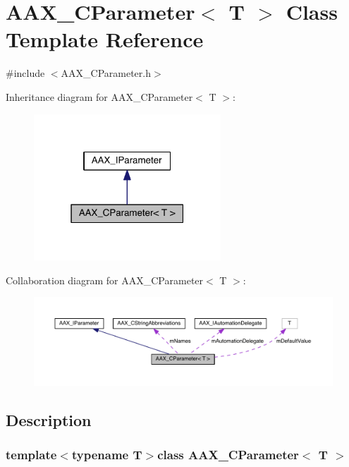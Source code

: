 \hypertarget{a00033}{}\section{A\+A\+X\+\_\+\+C\+Parameter$<$ T $>$ Class Template Reference}
\label{a00033}


{\ttfamily \#include $<$A\+A\+X\+\_\+\+C\+Parameter.\+h$>$}



Inheritance diagram for A\+A\+X\+\_\+\+C\+Parameter$<$ T $>$\+:
\nopagebreak
\begin{figure}[H]
\begin{center}
\leavevmode
\includegraphics[width=199pt]{a00447}
\end{center}
\end{figure}


Collaboration diagram for A\+A\+X\+\_\+\+C\+Parameter$<$ T $>$\+:
\nopagebreak
\begin{figure}[H]
\begin{center}
\leavevmode
\includegraphics[width=350pt]{a00448}
\end{center}
\end{figure}


\subsection{Description}
\subsubsection*{template$<$typename T$>$class A\+A\+X\+\_\+\+C\+Parameter$<$ T $>$}


